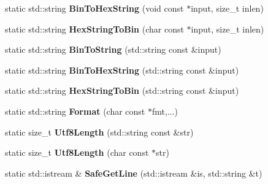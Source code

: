 \begin{DoxyCompactItemize}
\item 
\hypertarget{classlsf_1_1util_1_1StringExt_ae6524cfc1014b468fd9bcc2a94e6a2d1}{
static std::string {\bfseries BinToHexString} (void const $\ast$input, size\_\-t inlen)}
\label{classlsf_1_1util_1_1StringExt_ae6524cfc1014b468fd9bcc2a94e6a2d1}

\item 
\hypertarget{classlsf_1_1util_1_1StringExt_a3b1b5555efe4d611647b7f2da99b8664}{
static std::string {\bfseries HexStringToBin} (char const $\ast$input, size\_\-t inlen)}
\label{classlsf_1_1util_1_1StringExt_a3b1b5555efe4d611647b7f2da99b8664}

\item 
\hypertarget{classlsf_1_1util_1_1StringExt_a35461d430b8cac9cebb62882170a8867}{
static std::string {\bfseries BinToString} (std::string const \&input)}
\label{classlsf_1_1util_1_1StringExt_a35461d430b8cac9cebb62882170a8867}

\item 
\hypertarget{classlsf_1_1util_1_1StringExt_abc038d2b0181fd692690b3125ec2be5f}{
static std::string {\bfseries BinToHexString} (std::string const \&input)}
\label{classlsf_1_1util_1_1StringExt_abc038d2b0181fd692690b3125ec2be5f}

\item 
\hypertarget{classlsf_1_1util_1_1StringExt_a637b1ea40506f667ffce08780c8ffa4c}{
static std::string {\bfseries HexStringToBin} (std::string const \&input)}
\label{classlsf_1_1util_1_1StringExt_a637b1ea40506f667ffce08780c8ffa4c}

\item 
\hypertarget{classlsf_1_1util_1_1StringExt_a65240b9fa2e116d9bd51b8d16a00c86e}{
static std::string {\bfseries Format} (char const $\ast$fmt,...)}
\label{classlsf_1_1util_1_1StringExt_a65240b9fa2e116d9bd51b8d16a00c86e}

\item 
\hypertarget{classlsf_1_1util_1_1StringExt_a3c97c56670b2fe924fc0f4447464ec1f}{
static size\_\-t {\bfseries Utf8Length} (std::string const \&str)}
\label{classlsf_1_1util_1_1StringExt_a3c97c56670b2fe924fc0f4447464ec1f}

\item 
\hypertarget{classlsf_1_1util_1_1StringExt_adc34cd32331e78888afd8ee95d9cad07}{
static size\_\-t {\bfseries Utf8Length} (char const $\ast$str)}
\label{classlsf_1_1util_1_1StringExt_adc34cd32331e78888afd8ee95d9cad07}

\item 
\hypertarget{classlsf_1_1util_1_1StringExt_a8033929e8fb5716c6048291dd1861eaf}{
static std::istream \& {\bfseries SafeGetLine} (std::istream \&is, std::string \&t)}
\label{classlsf_1_1util_1_1StringExt_a8033929e8fb5716c6048291dd1861eaf}

\end{DoxyCompactItemize}
